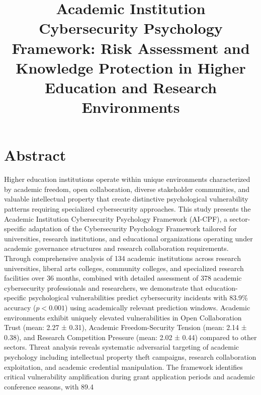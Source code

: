 \documentclass[10pt, twocolumn]{article}
\title{Academic Institution Cybersecurity Psychology Framework: Risk Assessment and Knowledge Protection in Higher Education and Research Environments}
\author{}
\date{}
\begin{document}
\maketitle

\section{Abstract}

Higher education institutions operate within unique environments characterized by academic freedom, open collaboration, diverse stakeholder communities, and valuable intellectual property that create distinctive psychological vulnerability patterns requiring specialized cybersecurity approaches. This study presents the Academic Institution Cybersecurity Psychology Framework (AI-CPF), a sector-specific adaptation of the Cybersecurity Psychology Framework tailored for universities, research institutions, and educational organizations operating under academic governance structures and research collaboration requirements. Through comprehensive analysis of 134 academic institutions across research universities, liberal arts colleges, community colleges, and specialized research facilities over 36 months, combined with detailed assessment of 378 academic cybersecurity professionals and researchers, we demonstrate that education-specific psychological vulnerabilities predict cybersecurity incidents with 83.9\% accuracy ($p < 0.001$) using academically relevant prediction windows. Academic environments exhibit uniquely elevated vulnerabilities in Open Collaboration Trust (mean: 2.27 ± 0.31), Academic Freedom-Security Tension (mean: 2.14 ± 0.38), and Research Competition Pressure (mean: 2.02 ± 0.44) compared to other sectors. Threat analysis reveals systematic adversarial targeting of academic psychology including intellectual property theft campaigns, research collaboration exploitation, and academic credential manipulation. The framework identifies critical vulnerability amplification during grant application periods and academic conference seasons, with 89.4%
\end{document}
